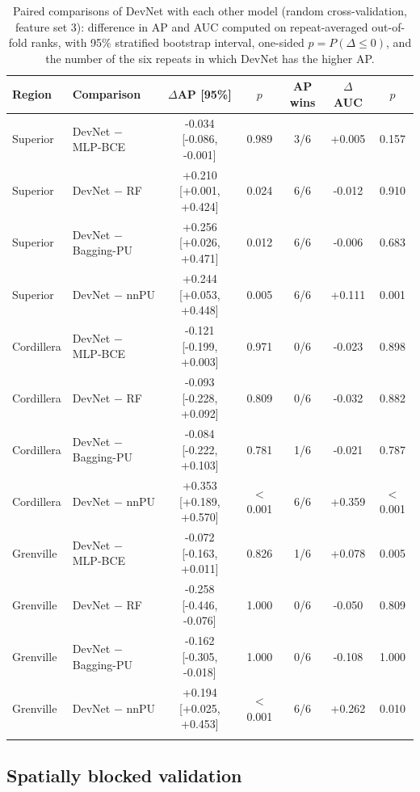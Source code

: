 \documentclass[pdflatex,sn-apa]{sn-jnl}
\begin{document}
\begin{table}[t]
\caption{Paired comparisons of DevNet with each other model (random cross-validation, feature set 3): difference in AP and AUC computed on repeat-averaged out-of-fold ranks, with 95\% stratified bootstrap interval, one-sided $p = P(\Delta \leq 0)$, and the number of the six repeats in which DevNet has the higher AP.}\label{tab:bootstrap}
\footnotesize
\setlength{\tabcolsep}{2.5pt}
\begin{tabular*}{\textwidth}{@{\extracolsep\fill}llccccc}
\toprule
Region & Comparison & $\Delta$AP [95\%] & $p$ & AP wins & $\Delta$AUC & $p$ \\
\midrule
Superior & DevNet $-$ MLP-BCE & -0.034 [-0.086, -0.001] & 0.989 & 3/6 & +0.005 & 0.157 \\
Superior & DevNet $-$ RF & +0.210 [+0.001, +0.424] & 0.024 & 6/6 & -0.012 & 0.910 \\
Superior & DevNet $-$ Bagging-PU & +0.256 [+0.026, +0.471] & 0.012 & 6/6 & -0.006 & 0.683 \\
Superior & DevNet $-$ nnPU & +0.244 [+0.053, +0.448] & 0.005 & 6/6 & +0.111 & 0.001 \\
\addlinespace
Cordillera & DevNet $-$ MLP-BCE & -0.121 [-0.199, +0.003] & 0.971 & 0/6 & -0.023 & 0.898 \\
Cordillera & DevNet $-$ RF & -0.093 [-0.228, +0.092] & 0.809 & 0/6 & -0.032 & 0.882 \\
Cordillera & DevNet $-$ Bagging-PU & -0.084 [-0.222, +0.103] & 0.781 & 1/6 & -0.021 & 0.787 \\
Cordillera & DevNet $-$ nnPU & +0.353 [+0.189, +0.570] & $<$0.001 & 6/6 & +0.359 & $<$0.001 \\
\addlinespace
Grenville & DevNet $-$ MLP-BCE & -0.072 [-0.163, +0.011] & 0.826 & 1/6 & +0.078 & 0.005 \\
Grenville & DevNet $-$ RF & -0.258 [-0.446, -0.076] & 1.000 & 0/6 & -0.050 & 0.809 \\
Grenville & DevNet $-$ Bagging-PU & -0.162 [-0.305, -0.018] & 1.000 & 0/6 & -0.108 & 1.000 \\
Grenville & DevNet $-$ nnPU & +0.194 [+0.025, +0.453] & $<$0.001 & 6/6 & +0.262 & 0.010 \\
\botrule
\end{tabular*}
\end{table}

\subsection{Spatially blocked validation}\label{sec:res-spatial}
\end{document}
